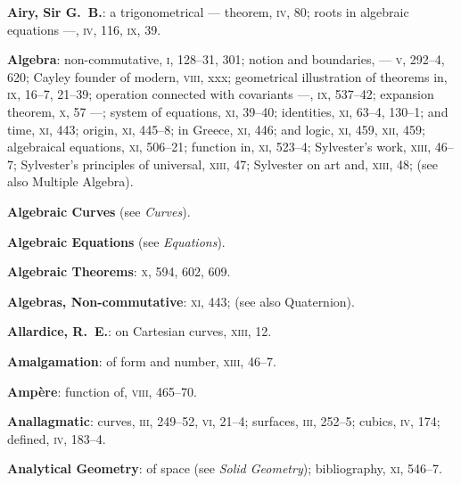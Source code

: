 \documentclass[11pt,a4paper]{book}
\begin{document}
\vspace{0.4em}
\textbf{Airy, Sir G.~B.}: a trigonometrical --- theorem, \textsc{iv}, 80; roots in algebraic equations ---, \textsc{iv}, 116, \textsc{ix}, 39.

\vspace{0.4em}
\textbf{Algebra}: non-commutative, \textsc{i}, 128--31, 301; notion and boundaries, --- \textsc{v}, 292--4, 620; Cayley founder of modern, \textsc{viii}, xxx; geometrical illustration of theorems in, \textsc{ix}, 16--7, 21--39; operation connected with covariants ---, \textsc{ix}, 537--42; expansion theorem, \textsc{x}, 57 ---; system of equations, \textsc{xi}, 39--40; identities, \textsc{xi}, 63--4, 130--1; and time, \textsc{xi}, 443; origin, \textsc{xi}, 445--8; in Greece, \textsc{xi}, 446; and logic, \textsc{xi}, 459, \textsc{xii}, 459; algebraical equations, \textsc{xi}, 506--21; function in, \textsc{xi}, 523--4; Sylvester's work, \textsc{xiii}, 46--7; Sylvester's principles of universal, \textsc{xiii}, 47; Sylvester on art and, \textsc{xiii}, 48; (see also Multiple Algebra).

\vspace{0.4em}
\textbf{Algebraic Curves} (see \textit{Curves}).

\vspace{0.4em}
\textbf{Algebraic Equations} (see \textit{Equations}).

\vspace{0.4em}
\textbf{Algebraic Theorems}: \textsc{x}, 594, 602, 609.

\vspace{0.4em}
\textbf{Algebras, Non-commutative}: \textsc{xi}, 443; (see also Quaternion).

\vspace{0.4em}
\textbf{Allardice, R.~E.}: on Cartesian curves, \textsc{xiii}, 12.

\vspace{0.4em}
\textbf{Amalgamation}: of form and number, \textsc{xiii}, 46--7.

\vspace{0.4em}
\textbf{Amp\`{e}re}: function of, \textsc{viii}, 465--70.

\vspace{0.4em}
\textbf{Anallagmatic}: curves, \textsc{iii}, 249--52, \textsc{vi}, 21--4; surfaces, \textsc{iii}, 252--5; cubics, \textsc{iv}, 174; defined, \textsc{iv}, 183--4.

\vspace{0.4em}
\textbf{Analytical Geometry}: of space (see \textit{Solid Geometry}); bibliography, \textsc{xi}, 546--7.
\end{document}
